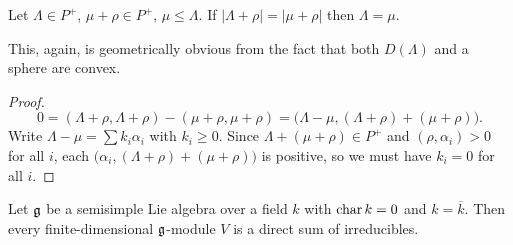 \begin{lemma}
Let $\Lambda \in P^+$, $\mu + \rho \in P^+$, $\mu \leq \Lambda$. If
$|\Lambda + \rho| = |\mu + \rho|$ then $\Lambda = \mu$.
\end{lemma}

\begin{remark}
This, again, is geometrically obvious from the fact that both $D(\Lambda)$ and
a sphere are convex.
\end{remark}

\begin{proof}
\[
  0 = (\Lambda + \rho, \Lambda + \rho) - (\mu + \rho, \mu + \rho)
    = \bigl(\Lambda - \mu, (\Lambda + \rho) + (\mu + \rho)\bigr).
\]
Write $\Lambda - \mu = \sum k_i\alpha_i$ with $k_i \geq 0$. Since
$\Lambda + (\mu + \rho) \in P^+$ and $(\rho, \alpha_i) > 0$ for all $i$, each
$\bigl(\alpha_i, (\Lambda + \rho) + (\mu + \rho)\bigr)$ is positive, so we
must have $k_i = 0$ for all $i$.
\end{proof}

\begin{theorem}
Let $\mathfrak{g}$ be a semisimple Lie algebra over a field $k$ with $\operatorname{char} k = 0$ and
$k = \overline{k}$. Then every finite-dimensional $\mathfrak{g}$-module $V$ is a direct
sum of irreducibles.
\end{theorem}

